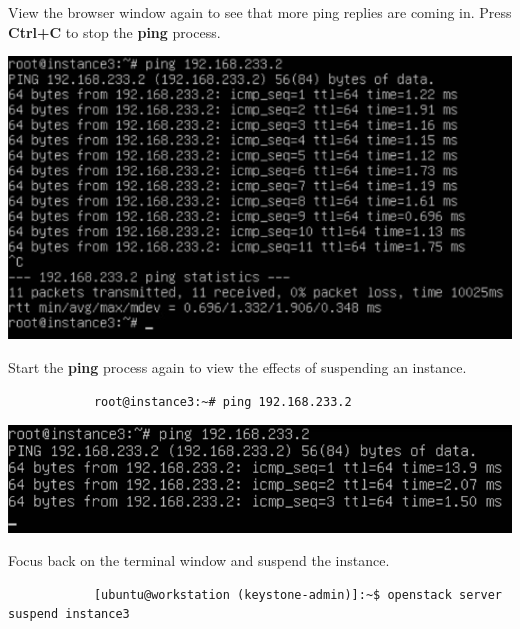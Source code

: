 \documentclass[letterpaper, 12pt]{article}
\begin{document}
\begin{enumerate}
    \begin{labstep}
        View the browser window again to see that more ping replies are coming in.
        Press \textbf{Ctrl+C} to stop the \textbf{ping} process.

        \begin{center}
            \includegraphics[width=\linewidth]{images/part4/step8.png}
        \end{center}
    \end{labstep}

    \begin{labstep}
        Start the \textbf{ping} process again to view the effects of suspending an instance.
        \begin{lstlisting}
            root@instance3:~# ping 192.168.233.2
        \end{lstlisting}

        \begin{center}
            \includegraphics[width=\linewidth]{images/part4/step9.png}
        \end{center}
    \end{labstep}

    \begin{labstep}
        Focus back on the terminal window and suspend the instance.
        \begin{lstlisting}
            [ubuntu@workstation (keystone-admin)]:~$ openstack server suspend instance3
        \end{lstlisting}


\end{labstep}
\end{enumerate}
\end{document}
